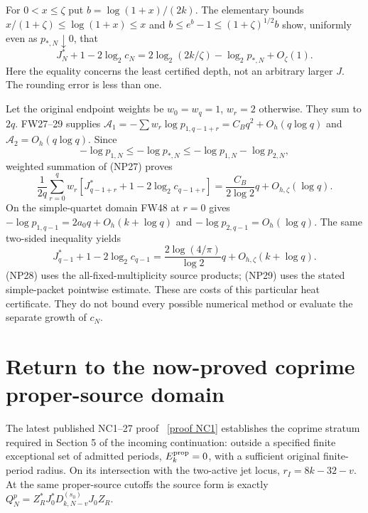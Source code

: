 \documentclass[11pt]{article}
\begin{document}
For $0<x\le\zeta$ put $b=\log(1+x)/(2k)$. The elementary bounds
$x/(1+\zeta)\le\log(1+x)\le x$ and
$b\le e^b-1\le(1+\zeta)^{1/2}b$ show, uniformly even as
$p_{*,N}\downarrow0$, that
\[
 J_N^*+1-2\log_2c_N
 =2\log_2(2k/\zeta)-\log_2p_{*,N}+O_\zeta(1).
 \tag{NP27}
\]
Here the equality concerns the least certified depth, not an arbitrary
larger $J$. The rounding error is less than one.

Let the original endpoint weights be $w_0=w_q=1$, $w_r=2$
otherwise. They sum to $2q$. FW27--29 supplies
$\mathscr A_1=-\sum w_r\log p_{1,q-1+r}=C_Bq^2+O_h(q\log q)$
and $\mathscr A_2=O_h(q\log q)$. Since
\[
 -\log p_{1,N}\le-\log p_{*,N}
       \le-\log p_{1,N}-\log p_{2,N},
\]
weighted summation of (NP27) proves
\[
 \frac1{2q}\sum_{r=0}^qw_r
 [J_{q-1+r}^*+1-2\log_2c_{q-1+r}]
 =\frac{C_B}{2\log2}q+O_{h,\zeta}(\log q).
 \tag{NP28}
\]
On the simple-quartet domain FW48 at $r=0$ gives
$-\log p_{1,q-1}=2a_0q+O_h(k+\log q)$ and
$-\log p_{2,q-1}=O_h(\log q)$. The same two-sided inequality yields
\[
 J_{q-1}^*+1-2\log_2c_{q-1}
 =\frac{2\log(4/\pi)}{\log2}q+O_{h,\zeta}(k+\log q).
 \tag{NP29}
\]
(NP28) uses the all-fixed-multiplicity source products; (NP29) uses
the stated simple-packet pointwise estimate. These are costs of this
particular heat certificate. They do not bound every possible numerical
method or evaluate the separate growth of $c_N$.

\section{Return to the now-proved coprime proper-source domain}
The latest published NC1--27 proof \cite{NC}%
~\href{https://github.com/KokunoYumeto/zeta-function-research-reader/blob/5992ad50c0f2a06921f1fcaded7b4e38097c0739/workbenches/splitzero-tandem/continuations/20260920-original-kernel-mixed-determinants/providers/ORIGINAL_CONDUCTOR_COPRIMALITY.tex\#L41}{[proof NC1]}%
{} establishes the
coprime stratum required in Section 5 of the incoming continuation:
outside a specified finite exceptional set of admitted periods,
$E_k^{\rm prop}=0$, with a sufficient original finite-period radius.
On its intersection with the two-active jet locus,
$r_I=8k-32-v$. At the same proper-source cutoffs the source form is
exactly $Q_N^p=Z_R^*J_0^*D_{k,N-v}^{(s_0)}J_0Z_R$.
\end{document}
